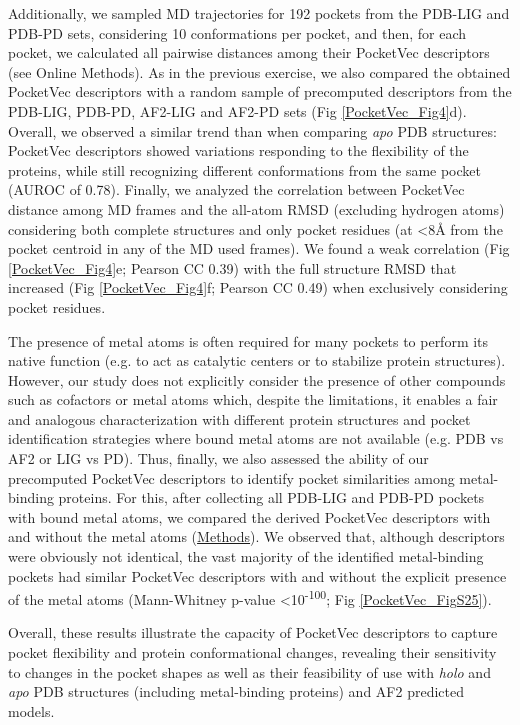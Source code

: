 Additionally, we sampled MD trajectories for 192 pockets from the PDB-LIG and PDB-PD sets, considering 10 conformations per pocket, and then, for each pocket, we calculated all pairwise distances among their PocketVec descriptors (see Online Methods). As in the previous exercise, we also compared the obtained PocketVec descriptors with a random sample of precomputed descriptors from the PDB-LIG, PDB-PD, AF2-LIG and AF2-PD sets (Fig \ref{PocketVec_Fig4}d). Overall, we observed a similar trend than when comparing \textit{apo} PDB structures: PocketVec descriptors showed variations responding to the flexibility of the proteins, while still recognizing different conformations from the same pocket (AUROC of 0.78). Finally, we analyzed the correlation between PocketVec distance among MD frames and the all-atom RMSD (excluding hydrogen atoms) considering both complete structures and only pocket residues (at <8Å from the pocket centroid in any of the MD used frames). We found a weak correlation (Fig \ref{PocketVec_Fig4}e; Pearson CC 0.39) with the full structure RMSD that increased (Fig \ref{PocketVec_Fig4}f; Pearson CC 0.49) when exclusively considering pocket residues. 

The presence of metal atoms is often required for many pockets to perform its native function (e.g. to act as catalytic centers or to stabilize protein structures). However, our study does not explicitly consider the presence of other compounds such as cofactors or metal atoms which, despite the limitations, it enables a fair and analogous characterization with different protein structures and pocket identification strategies where bound metal atoms are not available (e.g. PDB vs AF2 or LIG vs PD). Thus, finally, we also assessed the ability of our precomputed PocketVec descriptors to identify pocket similarities among metal-binding proteins. For this, after collecting all PDB-LIG and PDB-PD pockets with bound metal atoms, we compared the derived PocketVec descriptors with and without the metal atoms (\hyperref[PocketVec_Methods]{Methods}). We observed that, although descriptors were obviously not identical, the vast majority of the identified metal-binding pockets had similar PocketVec descriptors with and without the explicit presence of the metal atoms (Mann-Whitney p-value <10\textsuperscript{-100}; Fig \ref{PocketVec_FigS25}). 

Overall, these results illustrate the capacity of PocketVec descriptors to capture pocket flexibility and protein conformational changes, revealing their sensitivity to changes in the pocket shapes as well as their feasibility of use with \textit{holo} and \textit{apo} PDB structures (including metal-binding proteins) and AF2 predicted models. 


